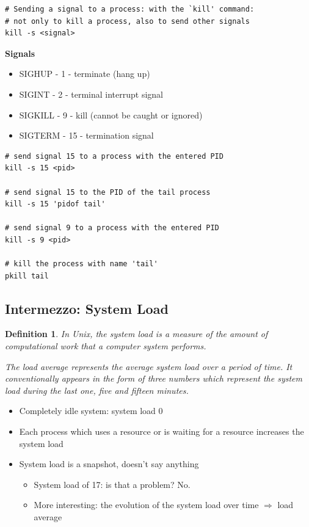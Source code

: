\documentclass{article}
\newtheorem{theorem}{Definition}[section]
\begin{document}
\begin{verbatim}
# Sending a signal to a process: with the `kill' command:
# not only to kill a process, also to send other signals
kill -s <signal>
\end{verbatim}

\textbf{Signals}

\begin{itemize}
    \item SIGHUP - 1 - terminate (hang up)
    \item SIGINT - 2 - terminal interrupt signal
    \item SIGKILL - 9 - kill (cannot be caught or ignored)
    \item SIGTERM - 15 - termination signal
\end{itemize}

\begin{verbatim}
# send signal 15 to a process with the entered PID
kill -s 15 <pid>

# send signal 15 to the PID of the tail process
kill -s 15 'pidof tail'

# send signal 9 to a process with the entered PID
kill -s 9 <pid>

# kill the process with name 'tail'
pkill tail
\end{verbatim}


\subsection{Intermezzo: System Load}

\begin{theorem}
    In Unix, the system load is a measure of the amount of computational
    work that a computer system performs. 
    
    The load average represents the average system load over a period of time. 
    It conventionally appears in the form of three numbers which represent the 
    system load during the last one, five and fifteen minutes.
\end{theorem}

\begin{itemize}
    \item Completely idle system: system load 0
    \item Each process which uses a resource or is waiting for a resource increases the system load
    \item System load is a snapshot, doesn't say anything
    \begin{itemize}
        \item System load of 17: is that a problem? No.
        \item More interesting: the evolution of the system load over time $\Rightarrow$ load average
    \end{itemize} 
\end{itemize}
\end{document}
